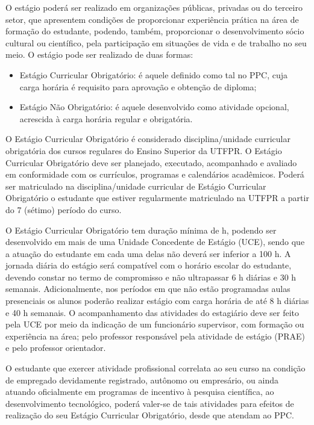 O estágio poderá ser realizado em organizações públicas, privadas ou do terceiro setor, que apresentem condições de proporcionar experiência prática na área de formação do estudante, podendo, também, proporcionar o desenvolvimento sócio cultural ou científico, pela participação em situações de vida e de trabalho no seu meio. O estágio pode ser realizado de duas formas:

\begin{itemize}
	\item Estágio Curricular Obrigatório: é aquele definido como tal no PPC, cuja carga horária é requisito para aprovação e obtenção de diploma;
	\item Estágio Não Obrigatório: é aquele desenvolvido como atividade opcional, acrescida à carga horária regular e obrigatória.
\end{itemize}

O Estágio Curricular Obrigatório é considerado disciplina/unidade curricular obrigatória dos cursos regulares do Ensino Superior da UTFPR. O Estágio Curricular Obrigatório deve ser planejado, executado, acompanhado e avaliado em conformidade com os currículos, programas e calendários acadêmicos. Poderá ser matriculado na disciplina/unidade curricular de Estágio Curricular Obrigatório o estudante que estiver regularmente matriculado na UTFPR a partir do 7\textordmasculine{} (sétimo) período do curso.

O Estágio Curricular Obrigatório tem duração mínima de  h, podendo ser desenvolvido em mais de uma Unidade Concedente de Estágio (UCE), sendo que a atuação do estudante em cada uma delas não deverá ser inferior a 100 h. A jornada diária do estágio será compatível com o horário escolar do estudante, devendo constar no termo de compromisso e não ultrapassar 6 h diárias e 30 h semanais. Adicionalmente, nos períodos em que não estão programadas aulas presenciais os alunos poderão realizar estágio com carga horária de até 8 h diárias e 40 h semanais. O acompanhamento das atividades do estagiário deve ser feito pela UCE por meio da indicação de um funcionário supervisor, com formação ou experiência na área; pelo professor responsável pela atividade de estágio (PRAE) e pelo professor orientador.

O estudante que exercer atividade profissional correlata ao seu curso na condição de empregado devidamente registrado, autônomo ou empresário, ou ainda atuando oficialmente em programas de incentivo à pesquisa científica, ao desenvolvimento tecnológico, poderá valer-se de tais atividades para efeitos de realização do seu Estágio Curricular Obrigatório, desde que atendam ao PPC.

